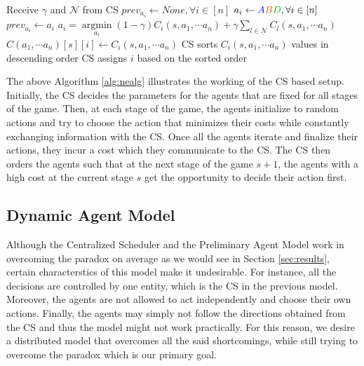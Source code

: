 \documentclass[11pt, letterpaper]{article}
\newcommand{\nodeA}{\textcolor{blue}{A}}
\newcommand{\nodeB}{\textcolor{orange!80!black}{B}}
\newcommand{\nodeD}{\textcolor{green!70!black}{D}}
\DeclareMathOperator*{\argmin}{argmin}
\begin{document}
\begin{algorithm}[H]
\caption{$C(a_1, \cdots a_n) = \text{CentralizedSchedulerArchitecture}(\gamma,|\mathcal{N}|,     \sum\limits_{l \in \mathcal{N}}C_l(a_1, \cdots a_n))$}\label{alg:nealg}
\begin{algorithmic}[1]
\State Receive $\gamma$ and $\mathcal{N}$ from CS
    \State $prev_{a_i} \gets None, \forall i \in [n]$
    \State $a_i \gets \nodeA\nodeB\nodeD, \forall i \in [n]$
        \State $prev_{a_i} \gets a_i$
        \State $a_i = \argmin\limits_{a_i} (1-\gamma) C_i(s,a_1, \cdots a_n) +  \gamma\sum\limits_{l \in \mathcal{N}}C_l(s,a_1, \cdots a_n)$
        \EndFor
    \EndWhile
    \State $C(a_1, \cdots a_n)[s][i] \gets C_i(s,a_1, \cdots a_n)$
    \State CS sorts $C_i(s,a_1, \cdots a_n)$ values in descending order
    \State CS assigns $i$ based on the sorted order
\EndFor
\end{algorithmic}
\end{algorithm}

The above Algorithm \ref{alg:nealg} illustrates the working of the CS based setup. Initially, the CS decides the parameters for the agents that are fixed for all stages of the game. Then, at each stage of the game, the agents initialize to random actions and try to choose the action that minimizes their costs while constantly exchanging information with the CS. Once all the agents iterate and finalize their actions, they incur a cost which they communicate to the CS. The CS then orders the agents such that at the next stage of the game $s+1$, the agents with a high cost at the current stage $s$ get the opportunity to decide their action first. 

\subsection{Dynamic Agent Model}\label{sub:DAM}
Although the Centralized Scheduler and the Preliminary Agent Model work in overcoming the paradox on average as we would see in Section \ref{sec:results}, certain characterstics of this model make it undesirable. For instance, all the decisions are controlled by one entity, which is the CS in the previous model. Moreover, the agents are not allowed to act independently and choose their own actions. Finally, the agents may simply not follow the directions obtained from the CS and thus the model might not work practically. For this reason, we desire a distributed model that overcomes all the said shortcomings, while still trying to overcome the paradox which is our primary goal. 
\end{document}

